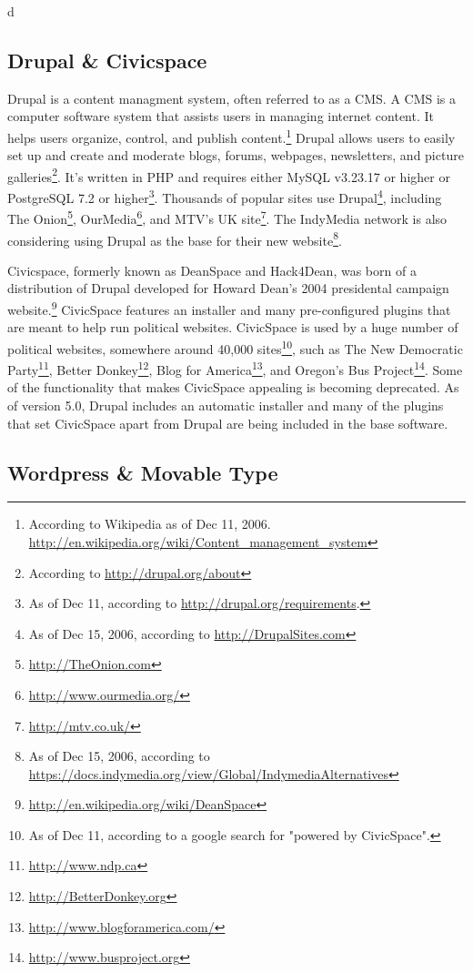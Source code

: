 d\documentclass[a4paper,12pt]{report}
\begin{document}
\subsection {Drupal & Civicspace}
Drupal is a content managment system, often referred to as a CMS.
A CMS is a computer software system that assists users in managing internet content. 
It helps users organize, control, and publish content.\footnote{According to Wikipedia as of Dec 11, 2006.  \url{http://en.wikipedia.org/wiki/Content_management_system}}
Drupal allows users to easily set up and create and moderate blogs, forums, webpages, newsletters, and picture galleries\footnote{According to \url{http://drupal.org/about}}. 
It's written in PHP and requires either MySQL v3.23.17 or higher or PostgreSQL 7.2 or higher\footnote{As of Dec 11, according to \url{http://drupal.org/requirements}.}. 
Thousands of popular sites use Drupal\footnote{As of Dec 15, 2006, according to \url{http://DrupalSites.com}}, including The Onion\footnote{\url{http://TheOnion.com}}, OurMedia\footnote{\url{http://www.ourmedia.org/}}, and MTV's UK site\footnote{\url{http://mtv.co.uk/}}. 
The IndyMedia network is also considering using Drupal as the base for their new website\footnote{As of Dec 15, 2006, according to \url{https://docs.indymedia.org/view/Global/IndymediaAlternatives}}. 

Civicspace, formerly known as DeanSpace and Hack4Dean, was born of a distribution of Drupal developed for Howard Dean's 2004 presidental campaign website.\footnote{\url{http://en.wikipedia.org/wiki/DeanSpace}}
CivicSpace features an installer and many pre-configured plugins that are meant to help run political websites.
CivicSpace is used by a huge number of political websites, somewhere around 40,000 sites\footnote{As of Dec 11, according to a google search for "powered by CivicSpace".}, such as The New Democratic Party\footnote{\url{http://www.ndp.ca}}, Better Donkey\footnote{\url{http://BetterDonkey.org}}, Blog for America\footnote{\url{http://www.blogforamerica.com/}}, and Oregon's Bus Project\footnote{\url{http://www.busproject.org}}.
Some of the functionality that makes CivicSpace appealing is becoming deprecated. 
As of version 5.0, Drupal includes an automatic installer and many of the plugins that set CivicSpace apart from Drupal are being included in the base software.

\subsection {Wordpress & Movable Type}
\end{document}
